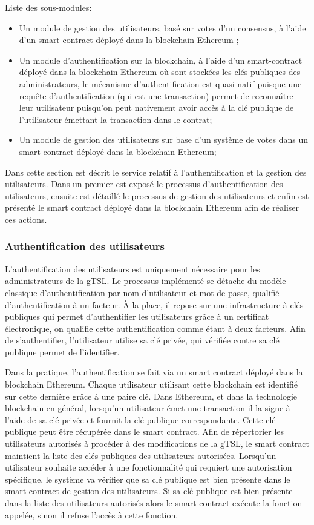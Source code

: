 \documentclass{tnreport}
\begin{document}
Liste des sous-modules:
\begin{itemize}
	\item Un module de gestion des utilisateurs, basé sur votes d’un consensus, à l’aide d’un smart-contract déployé dans la blockchain Ethereum ;
	\item Un module d'authentification sur la blockchain, à l’aide d’un smart-contract déployé dans la blockchain Ethereum où sont stockées les clés publiques des administrateurs, le mécanisme d'authentification est quasi natif puisque une requête d'authentification (qui est une transaction) permet de reconnaître leur utilisateur puisqu'on peut nativement avoir accès à la clé publique de l'utilisateur émettant la transaction dans le contrat;
	\item Un module de gestion des utilisateurs sur base d'un système de votes dans un smart-contract déployé dans la blockchain Ethereum;
\end{itemize}
\fi

Dans cette section est décrit le service relatif à l'authentification et la gestion des utilisateurs. Dans un premier est exposé le processus d'authentification des utilisateurs, ensuite est détaillé le processus de gestion des utilisateurs et enfin est présenté le smart contract déployé dans la blockchain Ethereum afin de réaliser ces actions.

\subsubsection{Authentification des utilisateurs}

L'authentification des utilisateurs est uniquement nécessaire pour les administrateurs de la gTSL. Le processus implémenté se détache du modèle classique d'authentification par nom d'utilisateur et mot de passe, qualifié d'authentification à un facteur. À la place, il repose sur une infrastructure à clés publiques qui permet d'authentifier les utilisateurs grâce à un certificat électronique, on qualifie cette authentification comme étant à deux facteurs. Afin de s'authentifier, l'utilisateur utilise sa clé privée, qui vérifiée contre sa clé publique permet de l'identifier.

Dans la pratique, l'authentification se fait via un smart contract déployé dans la blockchain Ethereum. Chaque utilisateur utilisant cette blockchain est identifié sur cette dernière grâce à une paire clé.
Dans Ethereum, et dans la technologie blockchain en général, lorsqu'un utilisateur émet une transaction il la signe à l'aide de sa clé privée et fournit la clé publique correspondante. Cette clé publique peut être récupérée dans le smart contract. 
Afin de répertorier les utilisateurs autorisés à procéder à des modifications de la gTSL, le smart contract maintient la liste des clés publiques des utilisateurs autorisées. 
Lorsqu'un utilisateur souhaite accéder à une fonctionnalité qui requiert une autorisation spécifique, le système va vérifier que sa clé publique est bien présente dans le smart contract de gestion des utilisateurs. Si sa clé publique est bien présente dans la liste des utilisateurs autorisés alors le smart contract exécute la fonction appelée, sinon il refuse l'accès à cette fonction.
\end{document}
